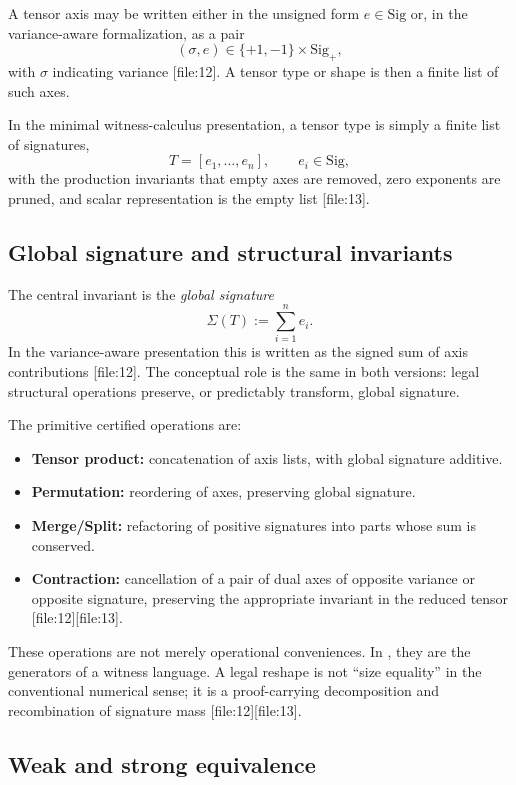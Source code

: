 \documentclass[11pt,a4paper]{article}
\newcommand{\Sig}{\mathrm{Sig}}
\newcommand{\globalSig}{\Sigma}
\newcommand{\PETC}{\mathrm{PETC}}
\begin{document}
A tensor axis may be written either in the unsigned form \(e \in \Sig\) or, in the variance-aware formalization, as a pair
\[
(\sigma,e) \in \{+1,-1\}\times \Sig_+,
\]
with \(\sigma\) indicating variance [file:12]. A tensor type or shape is then a finite list of such axes.

In the minimal witness-calculus presentation, a tensor type is simply a finite list of signatures,
\[
T = [e_1,\dots,e_n], \qquad e_i \in \Sig,
\]
with the production invariants that empty axes are removed, zero exponents are pruned, and scalar representation is the empty list [file:13].

\subsection{Global signature and structural invariants}

The central invariant is the \emph{global signature}
\[
\globalSig(T) := \sum_{i=1}^n e_i.
\]
In the variance-aware presentation this is written as the signed sum of axis contributions [file:12]. The conceptual role is the same in both versions: legal structural operations preserve, or predictably transform, global signature.

The primitive certified operations are:

\begin{itemize}[leftmargin=2em]
\item \textbf{Tensor product:} concatenation of axis lists, with global signature additive.
\item \textbf{Permutation:} reordering of axes, preserving global signature.
\item \textbf{Merge/Split:} refactoring of positive signatures into parts whose sum is conserved.
\item \textbf{Contraction:} cancellation of a pair of dual axes of opposite variance or opposite signature, preserving the appropriate invariant in the reduced tensor [file:12][file:13].
\end{itemize}

These operations are not merely operational conveniences. In \PETC, they are the generators of a witness language. A legal reshape is not ``size equality'' in the conventional numerical sense; it is a proof-carrying decomposition and recombination of signature mass [file:12][file:13].

\subsection{Weak and strong equivalence}
\end{document}
